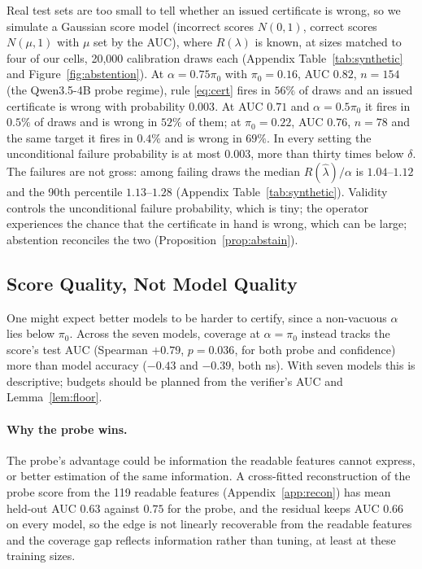 \documentclass[twoside]{article}
\theoremstyle{remark}
\newcommand{\Rsel}{R}
\newcommand{\lamhat}{\hat\lambda}
\newcommand{\pizero}{\pi_0}
\begin{document}
Real test sets are too small to tell whether an issued certificate is wrong, so we simulate a Gaussian score model (incorrect scores $N(0,1)$, correct scores $N(\mu,1)$ with $\mu$ set by the AUC), where $\Rsel(\lambda)$ is known, at sizes matched to four of our cells, 20{,}000 calibration draws each (Appendix Table~\ref{tab:synthetic} and Figure~\ref{fig:abstention}). At $\alpha=0.75\pizero$ with $\pizero=0.16$, AUC $0.82$, $n=154$ (the Qwen3.5-4B probe regime), rule \eqref{eq:cert} fires in $56\%$ of draws and an issued certificate is wrong with probability $0.003$. At AUC $0.71$ and $\alpha=0.5\pizero$ it fires in $0.5\%$ of draws and is wrong in $52\%$ of them; at $\pizero=0.22$, AUC $0.76$, $n=78$ and the same target it fires in $0.4\%$ and is wrong in $69\%$. In every setting the unconditional failure probability is at most $0.003$, more than thirty times below $\delta$. The failures are not gross: among failing draws the median $\Rsel(\lamhat)/\alpha$ is $1.04$--$1.12$ and the 90th percentile $1.13$--$1.28$ (Appendix Table~\ref{tab:synthetic}). Validity controls the unconditional failure probability, which is tiny; the operator experiences the chance that the certificate in hand is wrong, which can be large; abstention reconciles the two (Proposition~\ref{prop:abstain}).

\subsection{Score Quality, Not Model Quality}
\label{sec:auc}

One might expect better models to be harder to certify, since a non-vacuous $\alpha$ lies below $\pizero$. Across the seven models, coverage at $\alpha=\pizero$ instead tracks the score's test AUC (Spearman $+0.79$, $p=0.036$, for both probe and confidence) more than model accuracy ($-0.43$ and $-0.39$, both ns). With seven models this is descriptive; budgets should be planned from the verifier's AUC and Lemma~\ref{lem:floor}.

\paragraph{Why the probe wins.} The probe's advantage could be information the readable features cannot express, or better estimation of the same information. A cross-fitted reconstruction of the probe score from the 119 readable features (Appendix~\ref{app:recon}) has mean held-out AUC $0.63$ against $0.75$ for the probe, and the residual keeps AUC $0.66$ on every model, so the edge is not linearly recoverable from the readable features and the coverage gap reflects information rather than tuning, at least at these training sizes.
\end{document}
